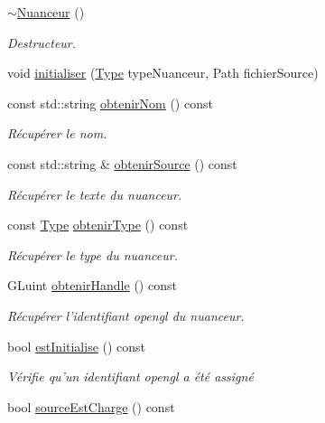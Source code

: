 \begin{DoxyCompactItemize}
\item 
\hyperlink{classopengl_1_1_nuanceur_a9e4703c2ea30007c34f21ea3e1264b1d}{$\sim$\-Nuanceur} ()
\begin{DoxyCompactList}\small\item\em Destructeur. \end{DoxyCompactList}\item 
void \hyperlink{classopengl_1_1_nuanceur_a5bb31fc7295863b91fd0ca724050a2f0}{initialiser} (\hyperlink{classopengl_1_1_nuanceur_ad2783f2cbd6fb7a5f6dc5032f998c65e}{Type} type\-Nuanceur, Path fichier\-Source)
\item 
const std\-::string \hyperlink{classopengl_1_1_nuanceur_afebe5099228e3ee004843fc97efe5884}{obtenir\-Nom} () const 
\begin{DoxyCompactList}\small\item\em Récupérer le nom. \end{DoxyCompactList}\item 
const std\-::string \& \hyperlink{classopengl_1_1_nuanceur_ab313cd056e0642b750e820df02874ab1}{obtenir\-Source} () const 
\begin{DoxyCompactList}\small\item\em Récupérer le texte du nuanceur. \end{DoxyCompactList}\item 
const \hyperlink{classopengl_1_1_nuanceur_ad2783f2cbd6fb7a5f6dc5032f998c65e}{Type} \hyperlink{classopengl_1_1_nuanceur_a894470a6ffd5a7762059680eef630548}{obtenir\-Type} () const 
\begin{DoxyCompactList}\small\item\em Récupérer le type du nuanceur. \end{DoxyCompactList}\item 
G\-Luint \hyperlink{classopengl_1_1_nuanceur_af7e326c1f8c91f629b7327e005b84fdb}{obtenir\-Handle} () const 
\begin{DoxyCompactList}\small\item\em Récupérer l'identifiant opengl du nuanceur. \end{DoxyCompactList}\item 
bool \hyperlink{classopengl_1_1_nuanceur_af6e827e93ce8398456f6781db5c84387}{est\-Initialise} () const 
\begin{DoxyCompactList}\small\item\em Vérifie qu'un identifiant opengl a été assigné \end{DoxyCompactList}\item 
bool \hyperlink{classopengl_1_1_nuanceur_a9373697b24d60d32bae78e183ccb7a4f}{source\-Est\-Charge} () const 

\end{DoxyCompactItemize}
